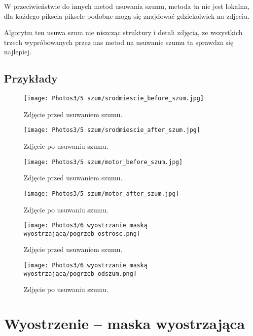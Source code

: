 \documentclass[]{mwart}
\begin{document}
W przeciwieństwie do innych metod usuwania szumu, metoda ta nie jest lokalna,
dla każdego piksela piksele podobne mogą się znajdować gdziekolwiek na zdjęciu.

Algorytm ten usuwa szum nie niszcząc struktury i detali zdjęcia, ze wszystkich trzech
wypróbowanych przez nas metod na usuwanie szumu ta sprawdza się najlepiej.
\newpage


\subsection{Przykłady}
\begin{figure}[H]
    \centering
    \texttt{[image: Photos3/5 szum/srodmiescie\_before\_szum.jpg]}
    \caption{Zdjęcie przed usuwaniem szumu.}
\end{figure}
\begin{figure}[H]
    \centering
    \texttt{[image: Photos3/5 szum/srodmiescie\_after\_szum.jpg]}
    \caption{Zdjęcie po usuwaniu szumu.}
\end{figure} \newpage

\begin{figure}[H]
    \centering
    \texttt{[image: Photos3/5 szum/motor\_before\_szum.jpg]}
    \caption{Zdjęcie przed usuwaniem szumu.}
\end{figure}
\begin{figure}[H]
    \centering
    \texttt{[image: Photos3/5 szum/motor\_after\_szum.jpg]}
    \caption{Zdjęcie po usuwaniu szumu.}
\end{figure}

\begin{figure}[H]
    \centering
    \texttt{[image: Photos3/6 wyostrzanie maską wyostrzającą/pogrzeb\_ostrosc.png]}
    \caption{Zdjęcie przed usuwaniem szumu.}
\end{figure}
\begin{figure}[H]
    \centering
    \texttt{[image: Photos3/6 wyostrzanie maską wyostrzającą/pogrzeb\_odszum.png]}
    \caption{Zdjęcie po usuwaniu szumu.}
\end{figure}



\newpage
\section{Wyostrzenie -- maska wyostrzająca      }
\end{document}
